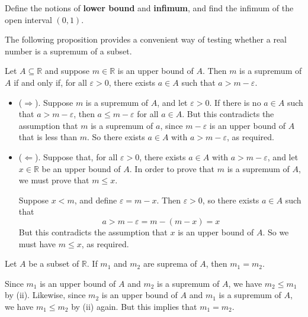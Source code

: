 \begin{exercise}
\label{exDefineLowerBoundInfimum}
Define the notions of \textbf{lower bound} and \textbf{infimum}, and find the infimum of the open interval $(0,1)$.
\end{exercise}

The following proposition provides a convenient way of testing whether a real number is a supremum of a subset.

\begin{proposition}
\label{propSupremumEpsilon}
Let $A \subseteq \mathbb{R}$ and suppose $m \in \mathbb{R}$ is an upper bound of $A$. Then $m$ is a supremum of $A$ if and only if, for all $\varepsilon > 0$, there exists $a \in A$ such that $a > m-\varepsilon$.
\end{proposition}

\begin{cproof}
\fixlistskip
\begin{itemize}
\item ($\Rightarrow$). Suppose $m$ is a supremum of $A$, and let $\varepsilon > 0$. If there is no $a \in A$ such that $a > m - \varepsilon$, then $a \le m-\varepsilon$ for all $a \in A$. But this contradicts the assumption that $m$ is a supremum of $a$, since $m-\varepsilon$ is an upper bound of $A$ that is less than $m$. So there exists $a \in A$ with $a > m - \varepsilon$, as required.

\item ($\Leftarrow$). Suppose that, for all $\varepsilon > 0$, there exists $a \in A$ with $a > m-\varepsilon$, and let $x \in \mathbb{R}$ be an upper bound of $A$. In order to prove that $m$ is a supremum of $A$, we must prove that $m \le x$.

Suppose $x < m$, and define $\varepsilon = m-x$. Then $\varepsilon > 0$, so there exists $a \in A$ such that
\[ a > m - \varepsilon = m - (m-x) = x \]
But this contradicts the assumption that $x$ is an upper bound of $A$. So we must have $m \le x$, as required.
\end{itemize}
\end{cproof}

\begin{theorem}
Let $A$ be a subset of $\mathbb{R}$. If $m_1$ and $m_2$ are suprema of $A$, then $m_1 = m_2$.
\end{theorem}

\begin{cproof}
Since $m_1$ is an upper bound of $A$ and $m_2$ is a supremum of $A$, we have $m_2 \le m_1$ by (ii). Likewise, since $m_2$ is an upper bound of $A$ and $m_1$ is a supremum of $A$, we have $m_1 \le m_2$ by (ii) again. But this implies that $m_1 = m_2$.
\end{cproof}


